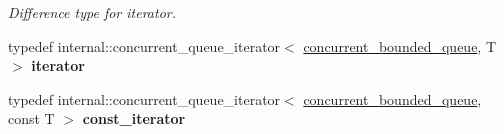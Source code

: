 \begin{DoxyCompactItemize}
\begin{DoxyCompactList}\small\item\em Difference type for iterator. \end{DoxyCompactList}\item 
\hypertarget{classtbb_1_1concurrent__bounded__queue_a42dfb71b1e4bdc0da3c1217d0d40ddd5}{}typedef internal\+::concurrent\+\_\+queue\+\_\+iterator$<$ \hyperlink{classtbb_1_1concurrent__bounded__queue}{concurrent\+\_\+bounded\+\_\+queue}, T $>$ {\bfseries iterator}\label{classtbb_1_1concurrent__bounded__queue_a42dfb71b1e4bdc0da3c1217d0d40ddd5}

\item 
\hypertarget{classtbb_1_1concurrent__bounded__queue_a18049841284051e18b854692bd04602c}{}typedef internal\+::concurrent\+\_\+queue\+\_\+iterator$<$ \hyperlink{classtbb_1_1concurrent__bounded__queue}{concurrent\+\_\+bounded\+\_\+queue}, const T $>$ {\bfseries const\+\_\+iterator}\label{classtbb_1_1concurrent__bounded__queue_a18049841284051e18b854692bd04602c}

\end{DoxyCompactItemize}
